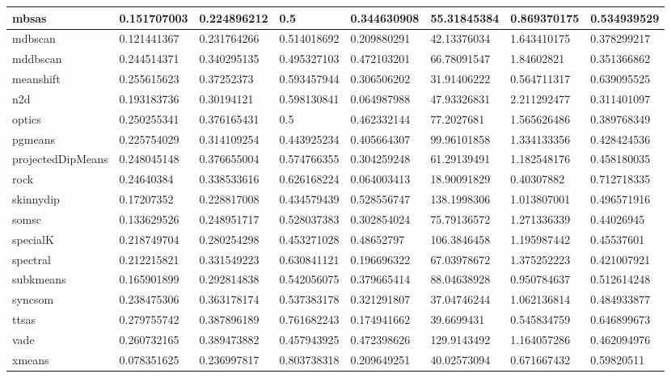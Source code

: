 \begin{table}[H]
\begin{tabular}{|l|l|l|l|l|l|l|l|}
\hline
mbsas & 0.151707003 & 0.224896212 & 0.5 & 0.344630908 & 55.31845384 & 0.869370175 & 0.534939529 \\
\hline
mdbscan & 0.121441367 & 0.231764266 & 0.514018692 & 0.209880291 & 42.13376034 & 1.643410175 & 0.378299217 \\
\hline
mddbscan & 0.244514371 & 0.340295135 & 0.495327103 & 0.472103201 & 66.78091547 & 1.84602821 & 0.351366862 \\
\hline
meanshift & 0.255615623 & 0.37252373 & 0.593457944 & 0.306506202 & 31.91406222 & 0.564711317 & 0.639095525 \\
\hline
n2d & 0.193183736 & 0.30194121 & 0.598130841 & 0.064987988 & 47.93326831 & 2.211292477 & 0.311401097 \\
\hline
optics & 0.250255341 & 0.376165431 & 0.5 & 0.462332144 & 77.2027681 & 1.565626486 & 0.389768349 \\
\hline
pgmeans & 0.225754029 & 0.314109254 & 0.443925234 & 0.405664307 & 99.96101858 & 1.334133356 & 0.428424536 \\
\hline
projectedDipMeans & 0.248045148 & 0.376655004 & 0.574766355 & 0.304259248 & 61.29139491 & 1.182548176 & 0.458180035 \\
\hline
rock & 0.24640384 & 0.338533616 & 0.626168224 & 0.064003413 & 18.90091829 & 0.40307882 & 0.712718335 \\
\hline
skinnydip & 0.17207352 & 0.228817008 & 0.434579439 & 0.528556747 & 138.1998306 & 1.013807001 & 0.496571916 \\
\hline
somsc & 0.133629526 & 0.248951717 & 0.528037383 & 0.302854024 & 75.79136572 & 1.271336339 & 0.44026945 \\
\hline
specialK & 0.218749704 & 0.280254298 & 0.453271028 & 0.48652797 & 106.3846458 & 1.195987442 & 0.45537601 \\
\hline
spectral & 0.212215821 & 0.331549223 & 0.630841121 & 0.196696322 & 67.03978672 & 1.375252223 & 0.421007921 \\
\hline
subkmeans & 0.165901899 & 0.292814838 & 0.542056075 & 0.379665414 & 88.04638928 & 0.950784637 & 0.512614248 \\
\hline
syncsom & 0.238475306 & 0.363178174 & 0.537383178 & 0.321291807 & 37.04746244 & 1.062136814 & 0.484933877 \\
\hline
ttsas & 0.279755742 & 0.387896189 & 0.761682243 & 0.174941662 & 39.6699431 & 0.545834759 & 0.646899673 \\
\hline
vade & 0.260732165 & 0.389473882 & 0.457943925 & 0.472398626 & 129.9143492 & 1.164057286 & 0.462094976 \\
\hline
xmeans & 0.078351625 & 0.236997817 & 0.803738318 & 0.209649251 & 40.02573094 & 0.671667432 & 0.59820511 \\
\hline
\end{tabular}
\end{table}

